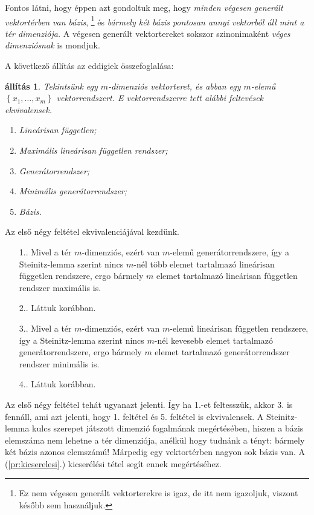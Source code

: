 \documentclass[a4paper, showtrims]{memoir}
\makeatletter
\renewenvironment{proof}[1][\proofname]
    {\par\pushQED{\qed}%
    \normalfont \topsep6\p@\@plus6\p@\relax
    \trivlist
    \item[\hskip\labelsep
        \itshape
    #1\@addpunct{:}]\ignorespaces}
    {\popQED\endtrivlist\@endpefalse}
\theoremstyle{plain}
\newtheorem{proposition}{állítás}[chapter]
\theoremstyle{remark}
\theoremstyle{definition}
\makeatother
\begin{document}
Fontos látni, hogy éppen azt gondoltuk meg, hogy \emph{minden végesen generált vektortérben van bázis},
\footnote{Ez nem végesen generált vektorterekre is igaz, de itt nem igazoljuk,
	viszont később sem használjuk.}
és \emph{bármely két bázis pontosan annyi vektorból áll mint a tér dimenziója.}
A végesen generált vektortereket sokszor szinonimaként \emph{véges dimenziósnak} is mondjuk.

A következő állítás az eddigiek összefoglalása:
\begin{proposition}
	Tekintsünk egy $m$-dimenziós vektorteret, és abban egy $m$-elemű
	$\left\{ x_1,\ldots,x_m \right\}$
	vektorrendszert.
	E vektorrendszerre tett alábbi feltevések ekvivalensek.
	\begin{enumerate}
		\item Lineárisan független;
		\item Maximális lineárisan független rendszer;
		\item Generátorrendszer;
		\item Minimális generátorrendszer;
		\item Bázis.\qedhere
	\end{enumerate}
\end{proposition}
\begin{proof}
	Az első négy feltétel ekvivalenciájával kezdünk.
	\begin{itemize}
		\item[1.\Rightarrow 2.]
		      Mivel a tér $m$-dimenziós, ezért van $m$-elemű generátorrendszere,
		      így a Steinitz-lemma szerint nincs $m$-nél több elemet tartalmazó lineárisan független
		      rendszere, ergo bármely $m$ elemet tartalmazó lineárisan független rendszer maximális is.
		\item[2.\Rightarrow 3.]
		      Láttuk korábban.
		\item[3.\Rightarrow 4.]
		      Mivel a tér $m$-dimenziós, ezért van $m$-elemű lineárisan független rendszere,
		      így a Steinitz-lemma szerint nincs $m$-nél kevesebb elemet tartalmazó generátorrendszere,
		      ergo bármely $m$ elemet tartalmazó generátorrendszer rendszer minimális is.
		\item[4.\Rightarrow 1.]
		      Láttuk korábban.
	\end{itemize}

	Az első négy feltétel tehát ugyanazt jelenti.
	Így ha 1.-et feltesszük, akkor 3. is fennáll, ami azt jelenti, hogy 1. feltétel és 5. feltétel is ekvivalensek.
\end{proof}
A Steinitz-lemma kulcs szerepet játszott dimenzió fogalmának megértésében,
hiszen a bázis elemszáma nem lehetne a tér dimenziója, anélkül hogy tudnánk a tényt:
bármely két bázis azonos elemszámú!
Márpedig egy vektortérben nagyon sok bázis van.
A (\ref{pr:kicserelesi}.) kicserélési tétel segít ennek megértéséhez.
\end{document}

